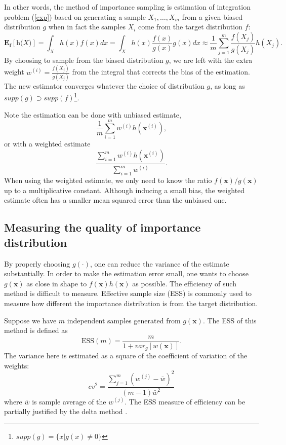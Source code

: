 \documentclass[times, utf8, diplomski]{fer}
\begin{document}
In other words, the method of importance sampling is estimation of integration problem (\ref{exp}) based on generating a sample $X_1, \ldots, X_m$ from a given biased distribution $\textit{g}$ when in fact the samples $X_i$ come from the target distribution $\textit{f}$:
\begin{equation}
\mathbf{E_f[\textit{h(X)}]} = \int_{X} h(x) f(x) dx = \int_{X} h(x) \frac{f(x)}{g(x)} g(x) dx \approx \frac{1}{m} \sum_{j = 1}^{m} \frac{f(X_j)}{g(X_j)} h(X_j).
\end{equation}
By choosing to sample from the biased distribution $g$, we are left with the extra weight $w^{(i)} = \frac{f(X_j)}{g(X_j)}$ from the integral that corrects the bias of the estimation. The new estimator converges whatever the choice of distribution $g$, as long as $supp(g) \supset supp(f)$\footnote{$supp(g) = \{x | g(x) \neq 0\}$}. %

Note the estimation can be done with unbiased estimate,
\begin{equation}
\frac{1}{m}\sum_{i=1}^{m}w^{(i)}h(\mathbf{x}^{(i)}),
\end{equation}
or with a weighted estimate
\begin{equation}
\frac{\sum_{i=1}^{m}w^{(i)}h(\mathbf{x}^{(i)})}{ \sum_{i=1}^{m}w^{(i)}}.
\label{wei_est}
\end{equation}
When using the weighted estimate, we only need to know the ratio $f(\mathbf{x})/g(\mathbf{x})$ up to a multiplicative constant. Although inducing a small bias, the weighted estimate often has a smaller mean squared error than the unbiased one.

\subsection{Measuring the quality of importance distribution}
By properly choosing $g(\cdot)$, one can reduce the variance of the estimate substantially. In order to make the estimation error small, one wants to choose $g(\mathbf{x})$ as close in shape to $f(\mathbf{x})h(\mathbf{x})$ as possible. The efficiency of such method is difficult to measure. Effective sample size (ESS) is commonly used to measure how different the importance distribution is from the target  distribution. %

Suppose we have $m$ independent samples generated from $g(\mathbf{x})$. The ESS of this method is defined as 
\begin{equation}
\text{ESS}(m) = \frac{m}{1 + var_g[w(\mathbf{x})]}.
\end{equation}  
The variance here is estimated as a square of the coefficient of variation of the weights:
\begin{equation*}
cv^2 = \frac{\sum_{j=1}^{m} (w^{(j)} - \bar{w})^2}{(m - 1)\bar{w}^2}
\end{equation*}
where $\bar{w}$ is sample average of the $w^{(j)}$. The ESS measure of efficiency can be partially justified by the delta method \cite{Liu}. %
\end{document}
